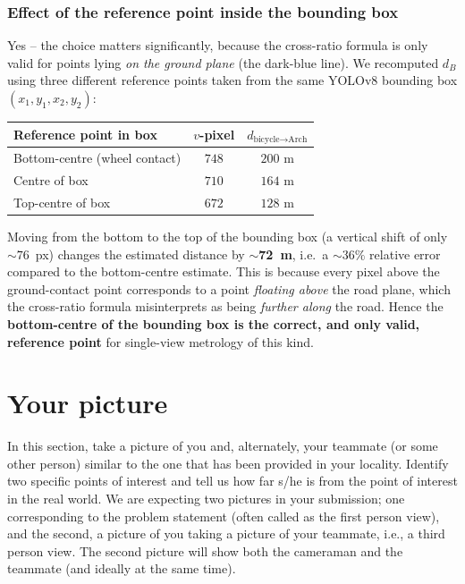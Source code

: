 \documentclass[11pt]{article}
\newenvironment{studentSpace}{\itshape}{}
\begin{document}
\begin{studentSpace}
\subsubsection*{Effect of the reference point inside the bounding box}

Yes -- the choice matters significantly, because the cross-ratio
formula is only valid for points lying \emph{on the ground plane}
(the dark-blue line). We recomputed $d_B$ using three different
reference points taken from the same YOLOv8 bounding box
$(x_1,y_1,x_2,y_2)$:

\medskip
\begin{center}
\begin{tabular}{lcc}
\hline
Reference point in box & $v$-pixel & $d_{\text{bicycle}\to\text{Arch}}$ \\
\hline
Bottom-centre (wheel contact)  & $748$ & $200$ m \\
Centre of box                  & $710$ & $164$ m \\
Top-centre of box              & $672$ & $128$ m \\
\hline
\end{tabular}
\end{center}

\medskip
Moving from the bottom to the top of the bounding box (a vertical
shift of only $\sim\!76$~px) changes the estimated distance by
\textbf{$\sim$72~m}, i.e.\ a $\sim 36\%$ relative error compared to the
bottom-centre estimate. This is because every pixel above the
ground-contact point corresponds to a point \emph{floating above} the
road plane, which the cross-ratio formula misinterprets as being
\emph{further along} the road. Hence the \textbf{bottom-centre of the
bounding box is the correct, and only valid, reference point} for
single-view metrology of this kind.
\end{studentSpace}


\section{Your picture}

In this section, take a picture of you and, alternately, your teammate
(or some other person) similar to the one that has been provided in
your locality. Identify two specific points of interest and tell us
how far s/he is from the point of interest in the real world. We are
expecting two pictures in your submission; one corresponding to the
problem statement (often called as the first person view), and the
second, a picture of you taking a picture of your teammate, i.e., a
third person view. The second picture will show both the cameraman and
the teammate (and ideally at the same time).
\end{document}
